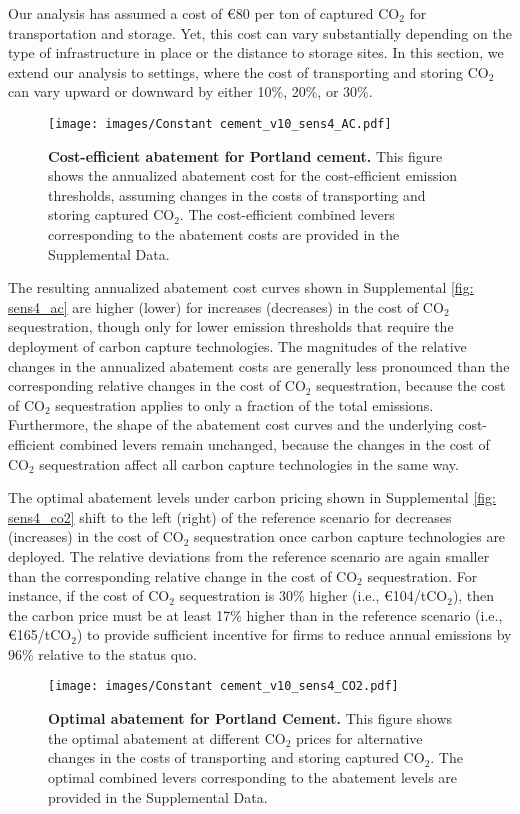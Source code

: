 \documentclass[12pt, a4paper]{article} %
\newcommand{\Suppl}{Supplemental}
\begin{document}
Our analysis has assumed a cost of \euro 80 per ton of captured CO$_2$ for transportation and storage. Yet, this cost can vary substantially depending on the type of infrastructure in place or the distance to storage sites. In this section, we extend our analysis to settings, where the cost of transporting and storing CO$_2$ can vary upward or downward by either 10\%, 20\%, or 30\%.

\begin{figure}[ht]
\centering
\texttt{[image: images/Constant cement\_v10\_sens4\_AC.pdf]}
\caption{\textbf{Cost-efficient abatement for Portland cement.} This figure shows the annualized abatement cost for the cost-efficient emission thresholds, assuming changes in the costs of transporting and storing captured CO$_2$. The cost-efficient combined levers corresponding to the abatement costs are provided in the \Suppl$ $ Data.}
\label{fig: sens4_ac}
\end{figure}

The resulting annualized abatement cost curves shown in \Suppl$ $ \autoref{fig: sens4_ac} are higher (lower) for increases (decreases) in the cost of CO$_2$ sequestration, though only for lower emission thresholds that require the deployment of carbon capture technologies. The magnitudes of the relative changes in the annualized abatement costs are generally less pronounced than the corresponding relative changes in the cost of CO$_2$ sequestration, because the cost of CO$_2$ sequestration applies to only a fraction of the total emissions. Furthermore, the shape of the abatement cost curves and the underlying cost-efficient combined levers remain unchanged, because the changes in the cost of CO$_2$ sequestration affect all carbon capture technologies in the same way.

The optimal abatement levels under carbon pricing shown in \Suppl$ $ \autoref{fig: sens4_co2} shift to the left (right) of the reference scenario for decreases (increases) in the cost of CO$_2$ sequestration once carbon capture technologies are deployed. The relative deviations from the reference scenario are again smaller than the corresponding relative change in the cost of CO$_2$ sequestration. For instance, if the cost of CO$_2$ sequestration is 30\% higher (i.e., \euro 104/tCO$_2$), then the carbon price must be at least 17\% higher than in the reference scenario (i.e., \euro 165/tCO$_2$) to provide sufficient incentive for firms to reduce annual emissions by 96\% relative to the status quo.

\begin{figure}[ht]
\centering
\texttt{[image: images/Constant cement\_v10\_sens4\_CO2.pdf]}
\caption{\textbf{Optimal abatement for Portland Cement.} This figure shows the optimal abatement at different CO$_2$ prices for alternative changes in the costs of transporting and storing captured CO$_2$. The optimal combined levers corresponding to the abatement levels are provided in the \Suppl$ $ Data.}
\label{fig: sens4_co2}
\end{figure}
\end{document}
